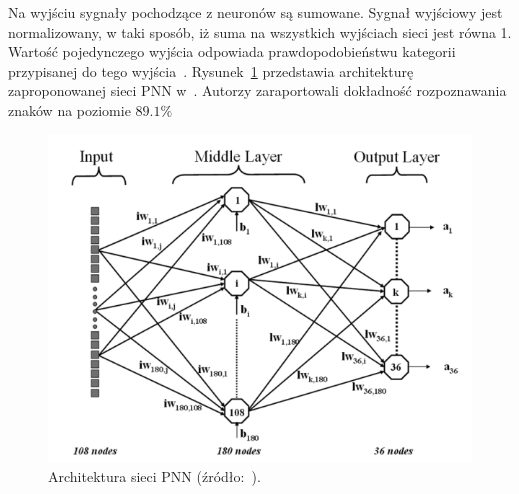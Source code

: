 Na wyjściu sygnały pochodzące z neuronów są sumowane.
Sygnał wyjściowy jest normalizowany, w taki sposób, iż suma na wszystkich wyjściach sieci jest równa 1.
Wartość pojedynczego wyjścia odpowiada prawdopodobieństwu kategorii przypisanej do tego wyjścia~\cite{Lexicon_on_Neural_networks}.
Rysunek~\ref{fig:pnn_architecture} przedstawia architekturę zaproponowanej sieci PNN w~\cite{1688109}.
Autorzy zaraportowali dokładność rozpoznawania znaków na poziomie $89.1\%$
\begin{figure}[!ht]
    \centering
    \includegraphics[scale=0.6]{Pictures/pnn_architecture}
    \caption{Architektura sieci PNN (źródło:~\cite{1688109}).}
    \label{fig:pnn_architecture}
\end{figure}
\FloatBarrier

